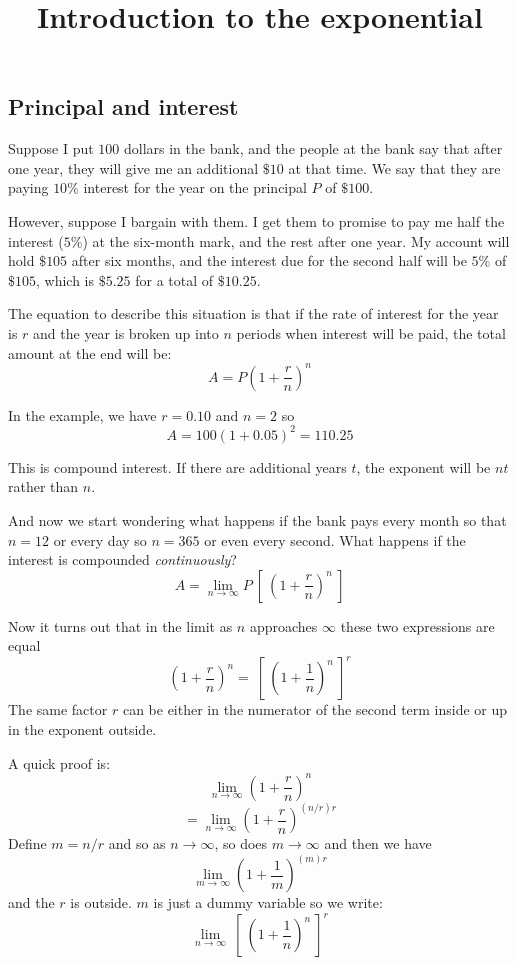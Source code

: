 \documentclass[11pt, oneside]{article}
\title{Introduction to the exponential}
\date{}
\begin{document}
\maketitle
\Large

\subsection*{Principal and interest}
Suppose I put $100$ dollars in the bank, and the people at the bank say that after one year, they will give me an additional $\$10$ at that time.  We say that they are paying $10\%$ interest for the year on the principal $P$ of $\$100$.

However, suppose I bargain with them.  I get them to promise to pay me half the interest ($5\%$) at the six-month mark, and the rest after one year.  My account will hold $\$105$ after six months, and the interest due for the second half will be $5\%$ of $\$105$, which is $\$5.25$ for a total of $\$10.25$.

The equation to describe this situation is that if the rate of interest for the year is $r$ and the year is broken up into $n$ periods when interest will be paid, the total amount at the end will be:
\[ A = P(1 + \frac{r}{n})^n \]

In the example, we have $r = 0.10$ and $n = 2$ so
\[ A = 100 (1 + 0.05)^{2} = 110.25 \]

This is compound interest.  If there are additional years $t$, the exponent will be $nt$ rather than $n$.

And now we start wondering what happens if the bank pays every month so that $n=12$ or every day so $n=365$ or even every second.  What happens if the interest is compounded \emph{continuously}?
\[ A = \lim_{n \rightarrow \infty} P \ [ \ (1 + \frac{r}{n})^{n} \ ] \]

Now it turns out that in the limit as $n$ approaches $\infty$ these two expressions are equal
\[ (1 + \frac{r}{n})^n = \ [ \ (1 + \frac{1}{n})^n \ ]^r \]
The same factor $r$ can be either in the numerator of the second term inside or up in the exponent outside.  

A quick proof is:
\[ \lim_{n \rightarrow \infty} (1 + \frac{r}{n})^{n}  \]
\[ = \lim_{n \rightarrow \infty} (1 + \frac{r}{n})^{(n/r)r} \]
Define $m = n/r$ and so as $n \rightarrow \infty$, so does $m \rightarrow \infty$ and then we have
\[ \lim_{m \rightarrow \infty} (1 + \frac{1}{m})^{(m)r} \]
and the $r$ is outside.  $m$ is just a dummy variable so we write:
\[ \lim_{n \rightarrow \infty} \ [ \  (1 + \frac{1}{n})^{n} \ ]^r \]
\end{document}
